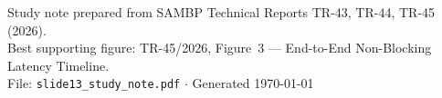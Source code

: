 \documentclass[12pt,a4paper]{article}
\begin{document}
\vspace{2em}
\begin{center}
\small\color{gray}
Study note prepared from SAMBP Technical Reports TR-43, TR-44, TR-45 (2026).\\
Best supporting figure: TR-45/2026, Figure~3 — End-to-End Non-Blocking Latency Timeline.\\
File: \texttt{slide13\_study\_note.pdf} $\cdot$ Generated \today
\end{center}
\end{document}
